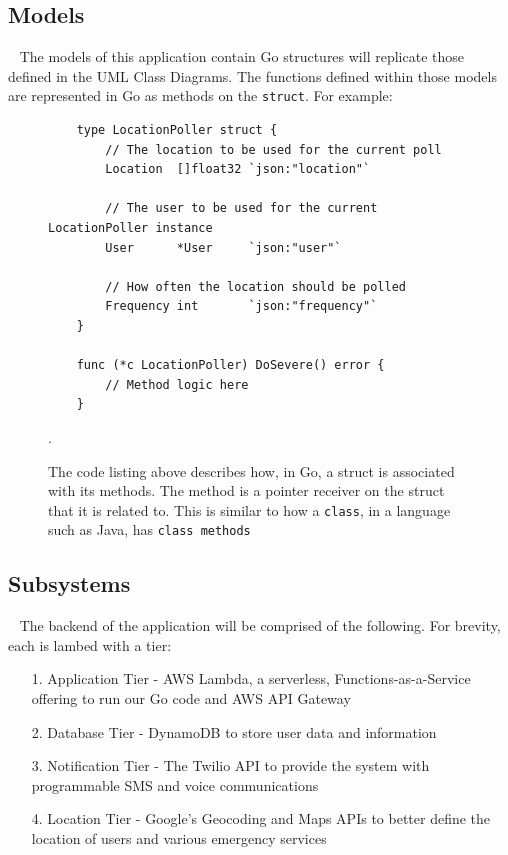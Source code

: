 \documentclass[10pt, a4paper]{article}
\begin{document}
\subsection{Models}
\par ~ The models of this application contain Go structures will replicate those defined in the UML Class Diagrams. The functions defined within those models are represented in Go as methods on the \texttt{struct}. For example:

\begin{figure}[H]
	\begin{center}
	\begin{lstlisting}
	type LocationPoller struct {
		// The location to be used for the current poll
		Location  []float32 `json:"location"`
		
		// The user to be used for the current LocationPoller instance
		User      *User     `json:"user"`
		
		// How often the location should be polled	
		Frequency int       `json:"frequency"`
	}

	func (*c LocationPoller) DoSevere() error {
		// Method logic here	
	}
	\end{lstlisting}
	\end{center}
\caption{The code listing above describes how, in Go, a struct is associated with its methods. The method is a pointer receiver on the struct that it is related to. This is similar to how a \texttt{class}, in a language such as Java, has \texttt{class methods}}.
\end{figure}

\subsection{Subsystems}
\par ~ The backend of the application will be comprised of the following. For brevity, each is lambed with a tier:
\begin{enumerate}
	\item[1.] Application Tier - AWS Lambda, a serverless, Functions-as-a-Service offering to run our Go code and AWS API Gateway
	\item[2.] Database Tier - DynamoDB to store user data and information
	\item[3.] Notification Tier - The Twilio API to provide the system with programmable SMS and voice communications
	\item[4.] Location Tier - Google's Geocoding and Maps APIs to better define the location of users and various emergency services
\end{enumerate}
\end{document}
